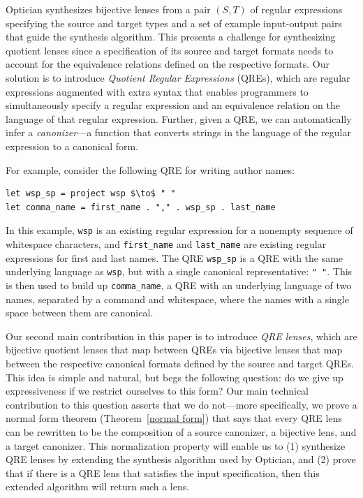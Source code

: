 \documentclass[acmsmall,review,anonymous]{acmart}
\begin{document}
Optician synthesizes bijective lenses from a pair $(S, T)$ of regular
expressions
specifying the source and target types and a set of example input-output pairs
that guide the synthesis algorithm. This presents a challenge for synthesizing
quotient lenses since a specification of its source and target formats
needs to account for the equivalence relations defined on the
respective formats. Our solution is to introduce {\em Quotient Regular
Expressions} (QREs), which are regular expressions augmented with extra
syntax that enables programmers to simultaneously specify a regular expression
and an equivalence relation on the language of that regular expression.
Further, given a QRE, we can automatically infer a \emph{canonizer}---a
function that converts strings in the language of the regular expression
to a canonical form.

For example, consider the following QRE for writing author names:
%
\begin{lstlisting}
let wsp_sp = project wsp $\to$ " "
let comma_name = first_name . "," . wsp_sp . last_name
\end{lstlisting}
%
In this example, \lstinline{wsp} is an existing regular expression for a
nonempty sequence of whitespace characters, and \lstinline{first_name} and
\lstinline{last_name} are existing regular expressions for first and last names.
The QRE \lstinline{wsp_sp} is a QRE with the same underlying language as
\lstinline{wsp}, but with a single canonical representative: \lstinline{" "}.
This is then used to build up \lstinline{comma_name}, a QRE with an
underlying language of two names, separated by a command and whitespace, where
the names with a single space between them are canonical.

Our second main contribution in this paper is to introduce {\em QRE lenses},
which are bijective quotient lenses that map between QREs via bijective lenses
that map between the respective canonical formats defined by the source and
target QREs. This idea is simple and natural, but begs the following question:
do we give up expressiveness if we restrict ourselves to this form? Our main
technical contribution to this question asserts that we do not---more
specifically, we prove a normal form theorem (Theorem~\ref{normal form})
that says that every QRE lens can be rewritten to be the composition of a
source canonizer, a bijective lens, and a target canonizer. This normalization
property will enable us to (1) synthesize QRE lenses by extending the synthesis
algorithm used by Optician, and (2) prove that if there is a QRE lens that
satisfies the input specification, then this extended algorithm will return
such a lens.
\end{document}
